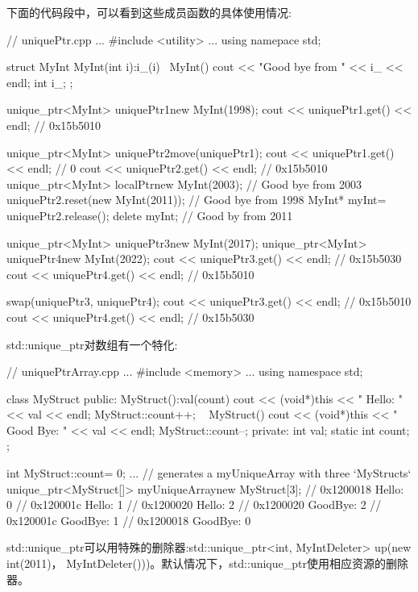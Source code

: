 下面的代码段中，可以看到这些成员函数的具体使用情况:


\begin{cpp}
// uniquePtr.cpp
...
#include <utility>
...
using namepace std;

struct MyInt{
	MyInt(int i):i_(i){}
	~MyInt(){
		cout << "Good bye from " << i_ << endl;
	}
	int i_;
};

unique_ptr<MyInt> uniquePtr1{new MyInt(1998)};
cout << uniquePtr1.get() << endl; // 0x15b5010

unique_ptr<MyInt> uniquePtr2{move(uniquePtr1)};
cout << uniquePtr1.get() << endl; // 0
cout << uniquePtr2.get() << endl; // 0x15b5010
{
	unique_ptr<MyInt> localPtr{new MyInt(2003)};
} // Good bye from 2003
uniquePtr2.reset(new MyInt(2011)); // Good bye from 1998
MyInt* myInt= uniquePtr2.release();
delete myInt; // Good by from 2011

unique_ptr<MyInt> uniquePtr3{new MyInt(2017)};
unique_ptr<MyInt> uniquePtr4{new MyInt(2022)};
cout << uniquePtr3.get() << endl; // 0x15b5030
cout << uniquePtr4.get() << endl; // 0x15b5010

swap(uniquePtr3, uniquePtr4);
cout << uniquePtr3.get() << endl; // 0x15b5010
cout << uniquePtr4.get() << endl; // 0x15b5030
\end{cpp}

std::unique\_ptr对数组有一个特化:


\begin{cpp}
// uniquePtrArray.cpp
...
#include <memory>
...
using namespace std;

class MyStruct{
	public:
	MyStruct():val(count){
		cout << (void*)this << " Hello: " << val << endl;
		MyStruct::count++;
	} ~
	MyStruct(){
		cout << (void*)this << " Good Bye: " << val << endl;
		MyStruct::count--;
	}
	private:
	int val;
	static int count;
};

int MyStruct::count= 0;
...
{
	// generates a myUniqueArray with three `MyStructs`
	unique_ptr<MyStruct[]> myUniqueArray{new MyStruct[3]};
}
// 0x1200018 Hello: 0
// 0x120001c Hello: 1
// 0x1200020 Hello: 2
// 0x1200020 GoodBye: 2
// 0x120001c GoodBye: 1
// 0x1200018 GoodBye: 0
\end{cpp}


std::unique\_ptr可以用特殊的删除器:std::unique\_ptr<int, MyIntDeleter> up(new int(2011)， MyIntDeleter()))。默认情况下，std::unique\_ptr使用相应资源的删除器。



